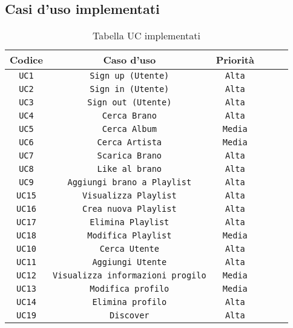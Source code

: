 \subsection{Casi d'uso implementati}
\begin{table} [h!]
    \begin{center}
        \begin{tabular}{ |Sc|Sc|Sc| } 
         \hline
         Codice & Caso d'uso & Priorità \\ 
         \hline
         \hline
         \texttt{UC1} & \texttt{Sign up (Utente)} & \texttt{Alta} \\ 
         \hline
         \texttt{UC2} & \texttt{Sign in (Utente)} & \texttt{Alta} \\ 
         \hline
         \texttt{UC3} & \texttt{Sign out (Utente)} & \texttt{Alta} \\ 
         \hline
         \texttt{UC4} & \texttt{Cerca Brano} & \texttt{Alta} \\ 
         \hline
         \texttt{UC5} & \texttt{Cerca Album} & \texttt{Media} \\ 
         \hline
         \texttt{UC6} & \texttt{Cerca Artista} & \texttt{Media} \\ 
         \hline
         \texttt{UC7} & \texttt{Scarica Brano} & \texttt{Alta} \\ 
         \hline
         \texttt{UC8} & \texttt{Like al brano} & \texttt{Alta} \\ 
         \hline
         \texttt{UC9} & \texttt{Aggiungi brano a Playlist} & \texttt{Alta} \\ 
         \hline
         \texttt{UC15} & \texttt{Visualizza Playlist} & \texttt{Alta} \\ 
         \hline
         \texttt{UC16} & \texttt{Crea nuova Playlist} & \texttt{Alta} \\ 
         \hline
         \texttt{UC17} & \texttt{Elimina Playlist} & \texttt{Alta} \\ 
         \hline
         \texttt{UC18} & \texttt{Modifica Playlist} & \texttt{Media} \\ 
         \hline
         \texttt{UC10} & \texttt{Cerca Utente} & \texttt{Alta} \\ 
         \hline
         \texttt{UC11} & \texttt{Aggiungi Utente} & \texttt{Alta} \\ 
         \hline
         \texttt{UC12} & \texttt{Visualizza informazioni progilo} & \texttt{Media} \\ 
         \hline
         \texttt{UC13} & \texttt{Modifica profilo} & \texttt{Media} \\ 
         \hline
         \texttt{UC14} & \texttt{Elimina profilo} & \texttt{Alta} \\ 
         \hline
         \texttt{UC19} & \texttt{Discover} & \texttt{Alta} \\ 
         \hline
        \end{tabular}
    \end{center}
    \caption{Tabella UC implementati}
\end{table}
    
